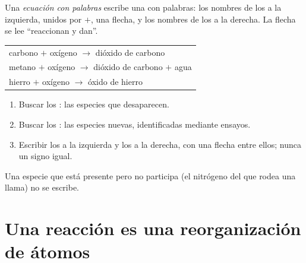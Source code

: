\begin{definition}\label{def:g7:chemical-reactions:word-equation}
Una \emph{ecuación con palabras} escribe
una  con palabras: los nombres de los  a la
izquierda, unidos por $+$, una flecha, y los nombres de los  a
la derecha. La flecha se lee ``reaccionan y dan''.
\end{definition}

\begin{example}\label{ex:g7:chemical-reactions:three}
\begin{center}
\begin{tabular}{l}
carbono $+$ oxígeno $\longrightarrow$ dióxido de carbono\\[2pt]
metano $+$ oxígeno $\longrightarrow$ dióxido de carbono $+$ agua\\[2pt]
hierro $+$ oxígeno $\longrightarrow$ óxido de hierro
\end{tabular}
\end{center}
\end{example}

\begin{method}\label{met:g7:chemical-reactions:write}
\begin{enumerate}
  \item Buscar los : las especies que desaparecen.
  \item Buscar los : las especies nuevas, identificadas
        mediante ensayos.
  \item Escribir los  a la izquierda y los  a la
        derecha, con una flecha entre ellos; nunca un signo igual.
\end{enumerate}
Una especie que está presente pero no participa (el nitrógeno del 
que rodea una llama) no se escribe.
\end{method}

\section{Una reacción es una reorganización de átomos}

